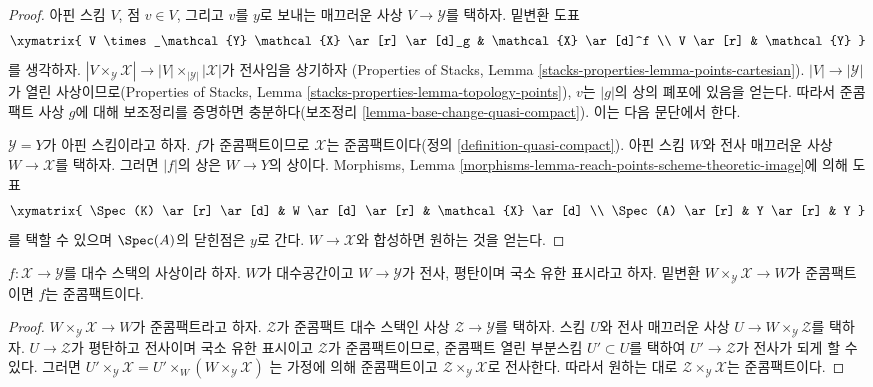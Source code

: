 \begin{proof}
아핀 스킴 $V$, 점 $v \in V$, 그리고 $v$를 $y$로 보내는 매끄러운 사상
$V \to \mathcal{Y}$를 택하자. 밑변환 도표
$$
\xymatrix{
V \times_\mathcal{Y} \mathcal{X} \ar[r] \ar[d]_g & \mathcal{X} \ar[d]^f \\
V \ar[r] & \mathcal{Y}
}
$$
를 생각하자. $|V \times_\mathcal{Y} \mathcal{X}| \to
|V| \times_{|\mathcal{Y}|} |\mathcal{X}|$가 전사임을 상기하자
(Properties of Stacks, Lemma
\ref{stacks-properties-lemma-points-cartesian}).
$|V| \to |\mathcal{Y}|$가 열린 사상이므로(Properties of Stacks, Lemma
\ref{stacks-properties-lemma-topology-points}), $v$는 $|g|$의 상의 폐포에
있음을 얻는다. 따라서 준콤팩트 사상 $g$에 대해 보조정리를 증명하면
충분하다(보조정리 \ref{lemma-base-change-quasi-compact}). 이는 다음
문단에서 한다.

\medskip\noindent
$\mathcal{Y} = Y$가 아핀 스킴이라고 하자. $f$가 준콤팩트이므로
$\mathcal{X}$는 준콤팩트이다(정의 \ref{definition-quasi-compact}).
아핀 스킴 $W$와 전사 매끄러운 사상 $W \to \mathcal{X}$를 택하자.
그러면 $|f|$의 상은 $W \to Y$의 상이다. Morphisms, Lemma
\ref{morphisms-lemma-reach-points-scheme-theoretic-image}에 의해 도표
$$
\xymatrix{
\Spec(K) \ar[r] \ar[d] & W \ar[d] \ar[r] & \mathcal{X} \ar[d] \\
\Spec(A) \ar[r] & Y \ar[r] & Y
}
$$
를 택할 수 있으며 $\Spec(A)$의 닫힌점은 $y$로 간다.
$W \to \mathcal{X}$와 합성하면 원하는 것을 얻는다.
\end{proof}

\begin{lemma}
\label{lemma-check-quasi-compact-covering}
$f : \mathcal{X} \to \mathcal{Y}$를 대수 스택의 사상이라 하자.
$W$가 대수공간이고 $W \to \mathcal{Y}$가 전사, 평탄이며
국소 유한 표시라고 하자. 밑변환
$W \times_\mathcal{Y} \mathcal{X} \to W$가 준콤팩트이면
$f$는 준콤팩트이다.
\end{lemma}

\begin{proof}
$W \times_\mathcal{Y} \mathcal{X} \to W$가 준콤팩트라고 하자.
$\mathcal{Z}$가 준콤팩트 대수 스택인 사상
$\mathcal{Z} \to \mathcal{Y}$를 택하자. 스킴 $U$와 전사 매끄러운 사상
$U \to W \times_\mathcal{Y} \mathcal{Z}$를 택하자.
$U \to \mathcal{Z}$가 평탄하고 전사이며 국소 유한 표시이고
$\mathcal{Z}$가 준콤팩트이므로, 준콤팩트 열린 부분스킴
$U' \subset U$를 택하여 $U' \to \mathcal{Z}$가 전사가 되게 할 수 있다.
그러면
$U' \times_\mathcal{Y} \mathcal{X} =
U' \times_W (W \times_\mathcal{Y} \mathcal{X})$
는 가정에 의해 준콤팩트이고
$\mathcal{Z} \times_\mathcal{Y} \mathcal{X}$로 전사한다.
따라서 원하는 대로 $\mathcal{Z} \times_\mathcal{Y} \mathcal{X}$는
준콤팩트이다.
\end{proof}












